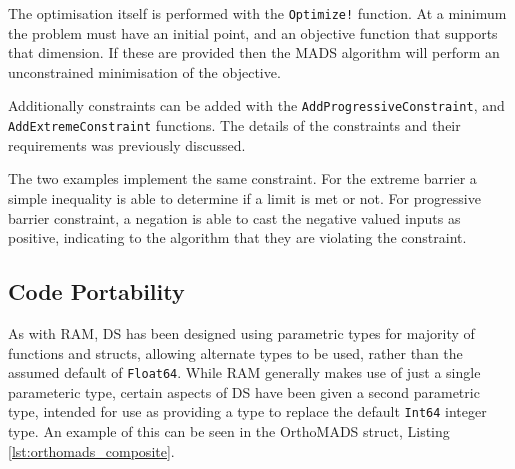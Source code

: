 The optimisation itself is performed with the \texttt{Optimize!} function. At a minimum the problem must have an initial point, and an objective function that supports that dimension. If these are provided then the MADS algorithm will perform an unconstrained minimisation of the objective.

Additionally constraints can be added with the \texttt{AddProgressiveConstraint}, and \texttt{AddExtremeConstraint} functions. The details of the constraints and their requirements was previously discussed.



The two examples implement the same constraint. For the extreme barrier a simple inequality is able to determine if a limit is met or not. For progressive barrier constraint, a negation is able to cast the negative valued inputs as positive, indicating to the algorithm that they are violating the constraint.
%
%
%

\subsection{Code Portability}\label{sub:ds_portability}
As with RAM, DS has been designed using parametric types for majority of functions and structs, allowing alternate types to be used, rather than the assumed default of \texttt{Float64}. While RAM generally makes use of just a single parameteric type, certain aspects of DS have been given a second parametric type, intended for use as providing a type to replace the default \texttt{Int64} integer type. An example of this can be seen in the OrthoMADS struct, Listing \ref{lst:orthomads_composite}. 


